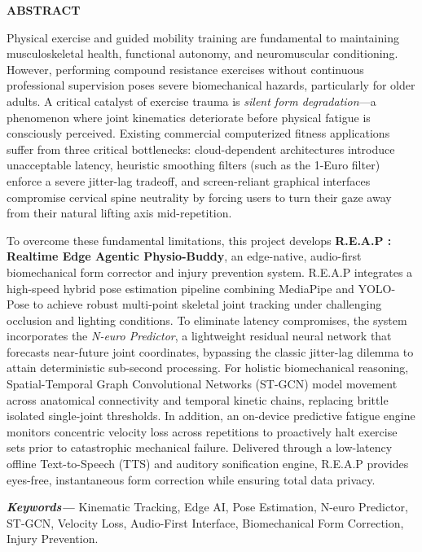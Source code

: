 \documentclass[12pt,a4paper]{report}
\providecommand{\keywords}[1]{\textbf{\textit{Keywords---}} #1}
\begin{document}
\begin{center}
\textbf{{\Large ABSTRACT}}\\
\begin{center}
\justifying
Physical exercise and guided mobility training are fundamental to maintaining musculoskeletal health, functional autonomy, and neuromuscular conditioning. However, performing compound resistance exercises without continuous professional supervision poses severe biomechanical hazards, particularly for older adults. A critical catalyst of exercise trauma is \textit{silent form degradation}---a phenomenon where joint kinematics deteriorate before physical fatigue is consciously perceived. Existing commercial computerized fitness applications suffer from three critical bottlenecks: cloud-dependent architectures introduce unacceptable latency, heuristic smoothing filters (such as the 1-Euro filter) enforce a severe jitter-lag tradeoff, and screen-reliant graphical interfaces compromise cervical spine neutrality by forcing users to turn their gaze away from their natural lifting axis mid-repetition.

To overcome these fundamental limitations, this project develops \textbf{R.E.A.P : Realtime Edge Agentic Physio-Buddy}, an edge-native, audio-first biomechanical form corrector and injury prevention system. R.E.A.P integrates a high-speed hybrid pose estimation pipeline combining MediaPipe and YOLO-Pose to achieve robust multi-point skeletal joint tracking under challenging occlusion and lighting conditions. To eliminate latency compromises, the system incorporates the \textit{N-euro Predictor}, a lightweight residual neural network that forecasts near-future joint coordinates, bypassing the classic jitter-lag dilemma to attain deterministic sub-second processing. For holistic biomechanical reasoning, Spatial-Temporal Graph Convolutional Networks (ST-GCN) model movement across anatomical connectivity and temporal kinetic chains, replacing brittle isolated single-joint thresholds. In addition, an on-device predictive fatigue engine monitors concentric velocity loss across repetitions to proactively halt exercise sets prior to catastrophic mechanical failure. Delivered through a low-latency offline Text-to-Speech (TTS) and auditory sonification engine, R.E.A.P provides eyes-free, instantaneous form correction while ensuring total data privacy.
\end{center}
\end{center}
\keywords{Kinematic Tracking, Edge AI, Pose Estimation, N-euro Predictor, ST-GCN, Velocity Loss, Audio-First Interface, Biomechanical Form Correction, Injury Prevention.}\\
\clearpage
\end{document}
